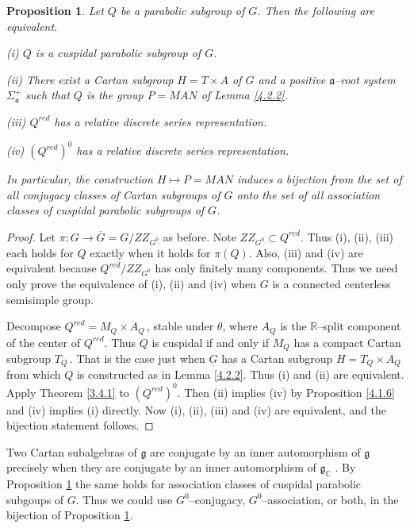 \documentclass{conm-p-l}
\newtheorem{proposition}[equation]{Proposition}
\renewcommand{\gg}{\mathfrak{g}}
\def\ga{\mathfrak{a}}
\def\gg{\mathfrak{g}}
\def\C{\mathbb{C}}
\def\R{\mathbb{R}}
\begin{document}
\begin{proposition}\label{4.2.3}
Let $Q$ be a parabolic subgroup of $G$.  Then the following are equivalent.

{\rm (i)} $Q$ is a cuspidal parabolic subgroup of $G$.

{\rm (ii)} There exist a Cartan subgroup $H = T\times A$ of $G$ and a positive
$\ga$--root system\\
\phantom{XXXXI} $\Sigma_\ga^+$ such that $Q$ is the group $P = MAN$
of {\rm Lemma \ref{4.2.2}}.

{\rm (iii)} $Q^{red}$ has a relative discrete series representation.

{\rm (iv)} $(Q^{red})^0$ has a relative discrete series representation.

In particular, the construction $H \mapsto P = MAN$ induces a bijection from
the set of all conjugacy classes of Cartan subgroups of $G$ onto the 
set of all association classes of cuspidal parabolic subgroups of $G$.
\end{proposition}

\begin{proof}
Let $\pi: G \to \overline{G} = G/ZZ_{G^0}$ as before.  Note
$ZZ_{G^0} \subset Q^{red}$.  Thus (i), (ii), (iii) each holds for $Q$
exactly when it holds for $\pi(Q)$.  Also, (iii) and (iv) are equivalent
because $Q^{red}/ZZ_{G^0}$ has only finitely many components.  Thus we need
only prove the equivalence of (i), (ii) and (iv) when $G$ is a connected
centerless semisimple group.

Decompose $Q^{red} = M_Q \times A_Q$\,, stable under $\theta$, where $A_Q$
is the $\R$--split component of the center of $Q^{red}$.  Thus $Q$ is 
cuspidal if and only if $M_Q$ has a compact Cartan subgroup $T_Q$\,.
That is the case just when $G$ has a Cartan subgroup $H = T_Q \times A_Q$
from which $Q$ is constructed as in Lemma \ref{4.2.2}.  Thus (i) and (ii)
are equivalent.  Apply Theorem \ref{3.4.1} to $(Q^{red})^0$.  Then (ii) 
implies (iv) by Proposition \ref{4.1.6} and (iv) implies (i) directly.
Now (i), (ii), (iii) and (iv) are equivalent, and the bijection statement
follows.
\end{proof}

Two Cartan subalgebras of $\gg$ are conjugate by an inner automorphism of
$\gg$ precisely when they are conjugate by an inner automorphism of $\gg_\C$
\cite[Corollary 2.4]{R1972}.  By Proposition \ref{4.2.3} the same holds
for association classes of cuspidal parabolic subgoups of $G$.  Thus we
could use $G^0$--conjugacy, $G^0$--association, or both, in the bijection
of Proposition \ref{4.2.3}.
\end{document}
